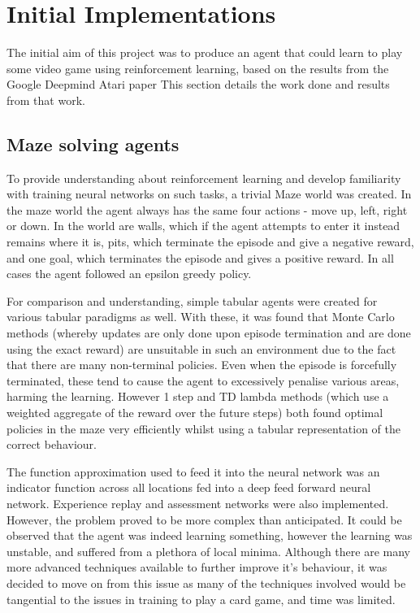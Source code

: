 \section{Initial Implementations}
The initial aim of this project was to produce an agent that could learn to play some video game using reinforcement learning, based on the results from the Google Deepmind Atari paper \cite{ataripaper} %
This section details the work done and results from that work.
\subsection{Maze solving agents}
To provide understanding about reinforcement learning and develop familiarity with training neural networks on such tasks, a trivial Maze world was created. In the maze world the agent always has the same four actions - move up, left, right or down. In the world are walls, which if the agent attempts to enter it instead remains where it is, pits, which terminate the episode and give a negative reward, and one goal, which terminates the episode and gives a positive reward.
In all cases the agent followed an epsilon greedy policy. %

For comparison and understanding, simple tabular agents were created for various tabular paradigms as well. With these, it was found that Monte Carlo methods (whereby updates are only done upon episode termination and are done using the exact reward) are unsuitable in such an environment due to the fact that there are many non-terminal policies. Even when the episode is forcefully terminated, these tend to cause the agent to excessively penalise various areas, harming the learning. However 1 step and TD lambda methods (which use a weighted aggregate of the reward over the future steps) both found optimal policies in the maze very efficiently whilst using a tabular representation of the correct behaviour.

The function approximation used to feed it into the neural network was an indicator function across all locations fed into a deep feed forward neural network. Experience replay and assessment networks were also implemented. However, the problem proved to be more complex than anticipated. It could be observed that the agent was indeed learning something, however the learning was unstable, and suffered from a plethora of local minima. Although there are many more advanced techniques available to further improve it's behaviour, it was decided to move on from this issue as many of the techniques involved would be tangential to the issues in training to play a card game, and time was limited.